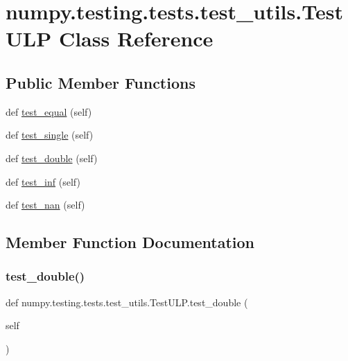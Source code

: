 \hypertarget{classnumpy_1_1testing_1_1tests_1_1test__utils_1_1TestULP}{}\section{numpy.\+testing.\+tests.\+test\+\_\+utils.\+Test\+U\+LP Class Reference}
\label{classnumpy_1_1testing_1_1tests_1_1test__utils_1_1TestULP}
\subsection*{Public Member Functions}
\begin{DoxyCompactItemize}
\item 
def \hyperlink{classnumpy_1_1testing_1_1tests_1_1test__utils_1_1TestULP_a978adbed0cc5b821c2125f49008e0f79}{test\+\_\+equal} (self)
\item 
def \hyperlink{classnumpy_1_1testing_1_1tests_1_1test__utils_1_1TestULP_a7865551d14b2eb55f1087aad6f74f020}{test\+\_\+single} (self)
\item 
def \hyperlink{classnumpy_1_1testing_1_1tests_1_1test__utils_1_1TestULP_a2e1207ce20cb937cdc5f2ee706af610f}{test\+\_\+double} (self)
\item 
def \hyperlink{classnumpy_1_1testing_1_1tests_1_1test__utils_1_1TestULP_a6fb80a6e630041a6efcc44a976d5acb3}{test\+\_\+inf} (self)
\item 
def \hyperlink{classnumpy_1_1testing_1_1tests_1_1test__utils_1_1TestULP_ae7f2c108d2d7c4b71ecedf8067cf2b09}{test\+\_\+nan} (self)
\end{DoxyCompactItemize}


\subsection{Member Function Documentation}
\mbox{\label{classnumpy_1_1testing_1_1tests_1_1test__utils_1_1TestULP_a2e1207ce20cb937cdc5f2ee706af610f}} 
\subsubsection{\texorpdfstring{test\+\_\+double()}{test\_double()}}
{\footnotesize\ttfamily def numpy.\+testing.\+tests.\+test\+\_\+utils.\+Test\+U\+L\+P.\+test\+\_\+double (\begin{DoxyParamCaption}\item[{}]{self }\end{DoxyParamCaption})}

